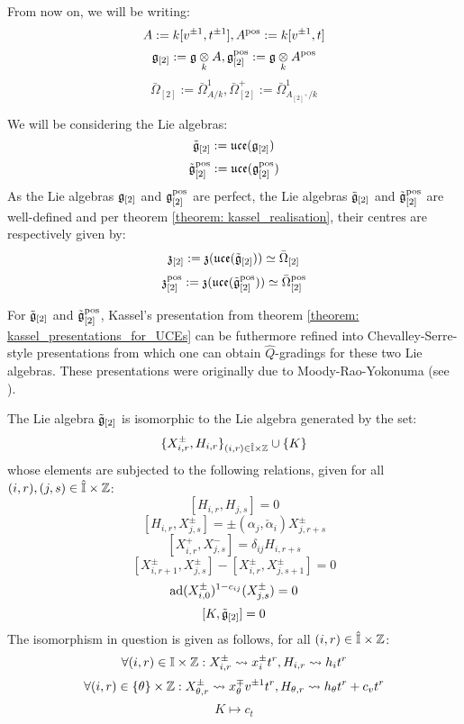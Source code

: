         \begin{convention}
            From now on, we will be writing:
                $$A := k[v^{\pm 1}, t^{\pm 1}], A^{\mathrm{pos}} := k[v^{\pm 1}, t]$$
                $$\g_{[2]} := \g \tensor_k A, \g_{[2]}^{\positive} := \g \tensor_k A^{\positive}$$
                $$\bar{\Omega}_{[2]} := \bar{\Omega}^1_{A/k}, \bar{\Omega}^+_{[2]} := \bar{\Omega}^1_{A_{[2]^+}/k}$$

            We will be considering the Lie algebras:
                $$\tilde{\mathfrak{g}}_{[2]} := \mathfrak{uce}(\mathfrak{g}_{[2]})$$
                $$\tilde{\mathfrak{g}}_{[2]}^{\mathrm{pos}} := \mathfrak{uce}(\mathfrak{g}_{[2]}^{\mathrm{pos}})$$
            As the Lie algebras $\mathfrak{g}_{[2]}$ and $\mathfrak{g}_{[2]}^{\mathrm{pos}}$ are perfect, the Lie algebras $\tilde{\mathfrak{g}}_{[2]}$ and $\tilde{\mathfrak{g}}_{[2]}^{\mathrm{pos}}$ are well-defined and per theorem \ref{theorem: kassel_realisation}, their centres are respectively given by:
                $$\mathfrak{z}_{[2]} := \mathfrak{z}(\mathfrak{uce}(\tilde{\mathfrak{g}}_{[2]})) \simeq \bar{\Omega}_{[2]}$$
                $$\mathfrak{z}_{[2]}^{\mathrm{pos}} := \mathfrak{z}(\mathfrak{uce}(\tilde{\mathfrak{g}}_{[2]}^{\mathrm{pos}})) \simeq \bar{\Omega}_{[2]}^{\mathrm{pos}}$$
        \end{convention}
        For $\tilde{\mathfrak{g}}_{[2]}$ and $\tilde{\mathfrak{g}}_{[2]}^{\mathrm{pos}}$, Kassel's presentation from theorem \ref{theorem: kassel_presentations_for_UCEs} can be futhermore refined into Chevalley-Serre-style presentations from which one can obtain $\hat{Q}$-gradings for these two Lie algebras. These presentations were originally due to Moody-Rao-Yokonuma (see \cite{moody_rao_yokonuma_vertex_representations_of_toroidal_lie_algebras}). 
        \begin{lemma} \label{lemma: chevalley_serre_presentation_for_central_extensions_of_multiloop_algebras}
            The Lie algebra $\tilde{\mathfrak{g}}_{[2]}$ is isomorphic to the Lie algebra generated by the set:
                $$\{ X_{i, r}^{\pm}, H_{i, r} \}_{(i, r) \in \hat{\simpleroots} \x \Z} \cup \{ K \}$$
            whose elements are subjected to the following relations, given for all $(i, r), (j, s) \in \hat{\simpleroots} \x \Z$:
                $$[ H_{i, r}, H_{j, s} ] = 0$$
                $$[ H_{i, r}, X_{j, s}^{\pm} ] = \pm (\alpha_j, \check{\alpha}_i) X_{j, r + s}^{\pm}$$
                $$[ X_{i, r}^+, X_{j, s}^- ] = \delta_{ij} H_{i, r + s}$$
                $$[ X_{i, r + 1}^{\pm}, X_{j, s}^{\pm} ] - [ X_{i, r}^{\pm}, X_{j, s + 1}^{\pm} ] = 0$$
                $$\mathrm{ad}(X_{i, 0}^{\pm})^{1 - c_{ij}}( X_{j, s}^{\pm} ) = 0$$
                $$[K, \tilde{\mathfrak{g}}_{[2]}] = 0$$
            The isomorphism in question is given as follows, for all $(i, r) \in \hat{\simpleroots} \x \Z$:
                $$\forall (i, r) \in \simpleroots \x \Z: X_{i, r}^{\pm} \mapsto x_i^{\pm} t^r, H_{i, r} \mapsto h_i t^r$$
                $$\forall (i, r) \in \{\theta\} \x \Z: X_{\theta, r}^{\pm} \mapsto x_{\theta}^{\mp} v^{\pm 1} t^r, H_{\theta, r} \mapsto h_{\theta} t^r + c_v t^r$$
                $$K \mapsto c_t$$
        \end{lemma}
